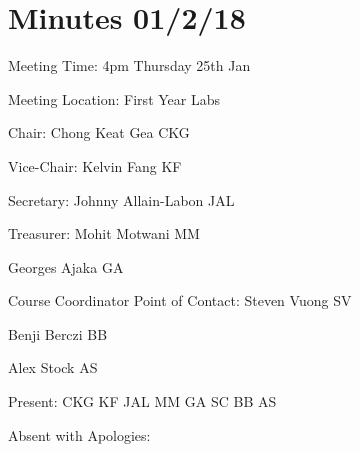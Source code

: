 
\noindent 
\section{Minutes 01/2/18}\label{app:1-2}

\noindent Meeting Time: 4pm Thursday 25th Jan

\noindent Meeting Location: First Year Labs\textbf{}\\

\noindent 

\noindent \textbf{}

\noindent Chair: Chong Keat Gea CKG

\noindent Vice-Chair: Kelvin Fang KF

\noindent Secretary: Johnny Allain-Labon JAL

\noindent Treasurer: Mohit Motwani MM

\noindent Georges Ajaka GA

\noindent Course Coordinator Point of Contact: Steven Vuong SV

\noindent Benji Berczi BB

\noindent Alex Stock AS

\noindent 

\noindent Present: CKG KF JAL MM GA SC BB AS

\noindent Absent with Apologies: \\

\noindent 

